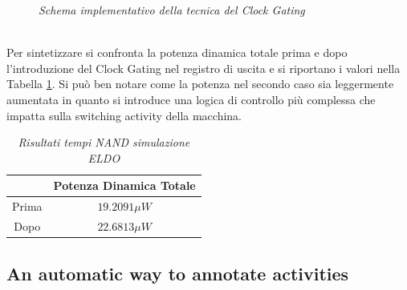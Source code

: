{\begin{figure}[!htb]
	\caption{\textit{Schema implementativo della tecnica del Clock Gating}}
	\label{elsif10}
\end{figure}
\\
Per sintetizzare si confronta la potenza dinamica totale prima e dopo l'introduzione del Clock Gating nel registro di uscita e si riportano i valori nella Tabella \ref{Tab3_1}. Si può ben notare come la potenza nel secondo caso sia leggermente aumentata in quanto si introduce una logica di controllo più complessa che impatta sulla switching activity della macchina.
\begin{table}[!h]\footnotesize
	\centering
	\begin{tabular}{|c|c|}
		\hline
		& \textbf{Potenza Dinamica Totale}\\
		\hline
		Prima & $19.2091 \mu W$\\
		Dopo & $22.6813 \mu W$\\
		\hline
	\end{tabular}
	\caption{\textit{Risultati tempi NAND simulazione ELDO}}
	\label{Tab3_1}
\end{table}

\subsection{An automatic way to annotate activities}

}
